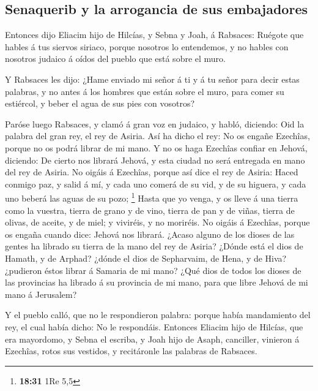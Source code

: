 \hypertarget{senaquerib-y-la-arrogancia-de-sus-embajadores}{%
\subsection{Senaquerib y la arrogancia de sus
embajadores}\label{senaquerib-y-la-arrogancia-de-sus-embajadores}}

 Entonces dijo Eliacim hijo de Hilcías, y Sebna y Joah, á
Rabsaces: Ruégote que hables á tus siervos siriaco, porque nosotros lo
entendemos, y no hables con nosotros judaico á oídos del pueblo que está
sobre el muro.

 Y Rabsaces les dijo: ¿Hame enviado mi señor á ti y á tu
señor para decir estas palabras, y no antes á los hombres que están
sobre el muro, para comer su estiércol, y beber el agua de sus pies con
vosotros?

 Paróse luego Rabsaces, y clamó á gran voz en judaico, y
habló, diciendo: Oid la palabra del gran rey, el rey de Asiria.
 Así ha dicho el rey: No os engañe Ezechîas, porque no os
podrá librar de mi mano.  Y no os haga Ezechîas confiar en
Jehová, diciendo: De cierto nos librará Jehová, y esta ciudad no será
entregada en mano del rey de Asiria.  No oigáis á Ezechîas,
porque así dice el rey de Asiria: Haced conmigo paz, y salid á mí, y
cada uno comerá de su vid, y de su higuera, y cada uno beberá las aguas
de su pozo; \footnote{\textbf{18:31} 1Re 5,5}  Hasta que yo
venga, y os lleve á una tierra como la vuestra, tierra de grano y de
vino, tierra de pan y de viñas, tierra de olivas, de aceite, y de miel;
y viviréis, y no moriréis. No oigáis á Ezechîas, porque os engaña cuando
dice: Jehová nos librará.  ¿Acaso alguno de los dioses de
las gentes ha librado su tierra de la mano del rey de Asiria?
 ¿Dónde está el dios de Hamath, y de Arphad? ¿dónde el dios
de Sepharvaim, de Hena, y de Hiva? ¿pudieron éstos librar á Samaria de
mi mano?  ¿Qué dios de todos los dioses de las provincias
ha librado á su provincia de mi mano, para que libre Jehová de mi mano á
Jerusalem?

 Y el pueblo calló, que no le respondieron palabra: porque
había mandamiento del rey, el cual había dicho: No le respondáis.
 Entonces Eliacim hijo de Hilcías, que era mayordomo, y
Sebna el escriba, y Joah hijo de Asaph, canciller, vinieron á Ezechîas,
rotos sus vestidos, y recitáronle las palabras de Rabsaces.

